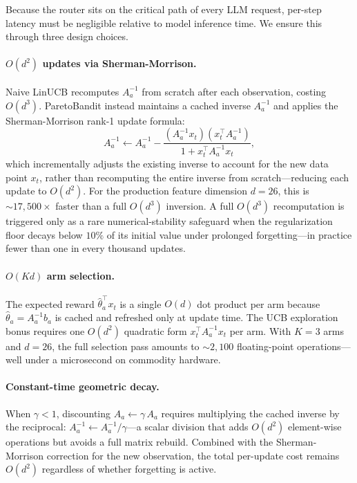 Because the router sits on the critical path of every LLM request, per-step latency must be negligible relative to model inference time.  We ensure this through three design choices.

\paragraph{$O(d^2)$ updates via Sherman-Morrison.}
Naive LinUCB recomputes $A_a^{-1}$ from scratch after each observation, costing $O(d^3)$.  ParetoBandit instead maintains a cached inverse $A_a^{-1}$ and applies the Sherman-Morrison rank-1 update formula:
\begin{equation}
    A_a^{-1} \leftarrow A_a^{-1}
        - \frac{(A_a^{-1} x_t)(x_t^\top A_a^{-1})}{1 + x_t^\top A_a^{-1} x_t},
    \label{eq:sherman_morrison}
\end{equation}
which incrementally adjusts the existing inverse to account for the new data point $x_t$, rather than recomputing the entire inverse from scratch---reducing each update to $O(d^2)$.  For the production feature dimension $d{=}26$, this is ${\sim}17{,}500\times$ faster than a full $O(d^3)$ inversion.  A full $O(d^3)$ recomputation is triggered only as a rare numerical-stability safeguard when the regularization floor decays below $10\%$ of its initial value under prolonged forgetting---in practice fewer than one in every thousand updates.

\paragraph{$O(Kd)$ arm selection.}
The expected reward $\hat{\theta}_a^\top x_t$ is a single $O(d)$ dot product per arm because $\hat{\theta}_a = A_a^{-1} b_a$ is cached and refreshed only at update time.  The UCB exploration bonus requires one $O(d^2)$ quadratic form $x_t^\top A_a^{-1} x_t$ per arm.  With $K{=}3$ arms and $d{=}26$, the full selection pass amounts to ${\sim}2{,}100$ floating-point operations---well under a microsecond on commodity hardware.

\paragraph{Constant-time geometric decay.}
When $\gamma < 1$, discounting $A_a \leftarrow \gamma\,A_a$ requires multiplying the cached inverse by the reciprocal: $A_a^{-1} \leftarrow A_a^{-1} / \gamma$---a scalar division that adds $O(d^2)$ element-wise operations but avoids a full matrix rebuild.  Combined with the Sherman-Morrison correction for the new observation, the total per-update cost remains $O(d^2)$ regardless of whether forgetting is active.


